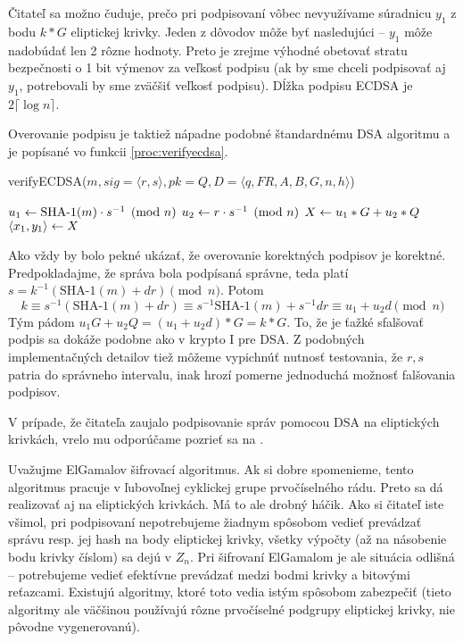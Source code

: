 Čitateľ sa možno čuduje, prečo pri podpisovaní vôbec nevyužívame
súradnicu $y_1$ z bodu $k*G$ eliptickej krivky. Jeden z dôvodov môže
byť nasledujúci -- $y_1$ môže nadobúdať len 2 rôzne hodnoty. Preto
je zrejme výhodné obetovať stratu bezpečnosti o 1 bit výmenov za veľkosť
podpisu (ak by sme chceli podpisovať aj $y_1$, potrebovali by sme
zväčšiť veľkosť podpisu). Dĺžka podpisu ECDSA je $2 \lceil \log n \rceil$.

Overovanie podpisu je taktiež nápadne podobné štandardnému DSA
algoritmu a je popísané vo funkcii \ref{proc:verifyecdsa}.

\begin{procedure}[H]
    \caption{verifyECDSA($m,sig=\langle r,s \rangle,pk= Q,
            D=\langle q,FR, A,B,G,n,h \rangle$)}
    \label{proc:verifyecdsa}
    \;
    $u_1 \leftarrow \mbox{SHA-1}(m) \cdot s^{-1} \pmod{n}$ \;
    $u_2 \leftarrow r \cdot s^{-1} \pmod{n}$ \;
    $X \leftarrow u_1 * G + u_2 * Q$ \;
    $ \langle x_1, y_1 \rangle \leftarrow X$ \;
\end{procedure}

Ako vždy by bolo pekné ukázať, že overovanie korektných podpisov
je korektné.
Predpokladajme, že správa bola podpísaná správne, teda platí
$s = k^{-1} (\mbox{SHA-1}(m) + d r) \pmod{n}$.
Potom 
\begin{equation*}
    k \equiv s^{-1} (\mbox{SHA-1}(m) + d r)  \equiv
    s^{-1} \mbox{SHA-1}(m) + s^{-1} d r \equiv u_1 + u_2 d \pmod{n}
\end{equation*}
Tým pádom $u_1 G + u_2 Q = (u_1 + u_2 d)*G = k*G$.
To, že je ťažké sfalšovať podpis sa dokáže podobne ako v krypto I pre
DSA. Z podobných implementačných detailov tiež môžeme vypichnúť
nutnosť testovania,
že $r,s$ patria do správneho intervalu, inak hrozí pomerne jednoduchá
možnosť falšovania podpisov.

V prípade, že čitateľa zaujalo podpisovanie správ pomocou DSA na eliptických
krivkách, vrelo mu odporúčame pozrieť sa na \cite{ecdsa}.

\begin{poznamka}
    Uvažujme ElGamalov šifrovací algoritmus. Ak si dobre spomenieme,
    tento algoritmus pracuje v ľubovoľnej cyklickej grupe
    prvočíselného rádu. Preto sa dá realizovať aj na eliptických
    krivkách. Má to ale drobný háčik.
    Ako si čitateľ iste všimol, pri podpisovaní nepotrebujeme
    žiadnym spôsobom vedieť prevádzať správu resp. jej hash na body
    eliptickej krivky, všetky výpočty (až na násobenie bodu krivky
    číslom) sa dejú v $Z_n$. Pri šifrovaní ElGamalom 
    je ale situácia odlišná -- potrebujeme vedieť efektívne prevádzať
    medzi bodmi krivky a bitovými reťazcami. Existujú algoritmy, ktoré
    toto vedia istým spôsobom zabezpečiť (tieto algoritmy ale väčšinou
    používajú rôzne prvočíselné podgrupy eliptickej krivky, nie
    pôvodne vygenerovanú).
\end{poznamka}

